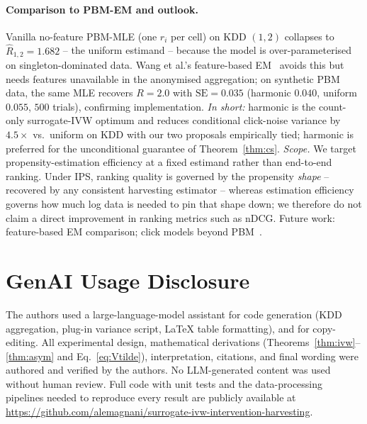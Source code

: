 \documentclass[sigconf]{acmart}
\begin{document}
\paragraph{Comparison to PBM-EM and outlook.}
Vanilla no-feature PBM-MLE (one $r_i$ per cell) on KDD $(1,2)$
collapses to $\hat R_{1,2}=1.682$ -- the uniform estimand -- because
the model is over-parameterised on singleton-dominated data. Wang
et al.'s feature-based EM~\cite{wang2018position} avoids this but
needs features unavailable in the anonymised aggregation; on
synthetic PBM data, the same MLE recovers $R=2.0$ with
$\mathrm{SE}=0.035$ (harmonic $0.040$, uniform $0.055$, $500$ trials),
confirming implementation. \emph{In short:} harmonic is the
count-only surrogate-IVW optimum and reduces conditional click-noise
variance by $4.5\times$ vs.\ uniform on KDD with our two proposals
empirically tied; harmonic is preferred for the unconditional
guarantee of Theorem~\ref{thm:cs}. \emph{Scope.} We target
propensity-estimation efficiency at a fixed estimand rather than
end-to-end ranking. Under IPS, ranking quality is governed by the
propensity \emph{shape} -- recovered by any consistent harvesting
estimator -- whereas estimation efficiency governs how much log data is
needed to pin that shape down; we therefore do not claim a direct
improvement in ranking metrics such as nDCG. Future work: feature-based EM
comparison; click models beyond
PBM~\cite{yue2010beyond,chuklin2015clickmodels}.

\section*{GenAI Usage Disclosure}
The authors used a large-language-model assistant for code generation
(KDD aggregation, plug-in variance script, LaTeX table formatting), and for
copy-editing. All experimental design, mathematical derivations
(Theorems~\ref{thm:ivw}--\ref{thm:asym} and Eq.~\eqref{eq:Vtilde}),
interpretation, citations, and final wording were authored and verified by
the authors. No LLM-generated content was used without human review. Full
code with unit tests and the data-processing pipelines needed to reproduce
every result are publicly available at
\url{https://github.com/alemagnani/surrogate-ivw-intervention-harvesting}.
\end{document}
